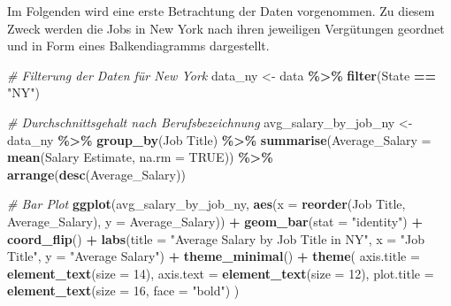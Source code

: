\documentclass[
]{article}
\newenvironment{Shaded}{\begin{snugshade}}{\end{snugshade}}
\newcommand{\AttributeTok}[1]{\textcolor[rgb]{0.13,0.29,0.53}{#1}}
\newcommand{\CommentTok}[1]{\textcolor[rgb]{0.56,0.35,0.01}{\textit{#1}}}
\newcommand{\ConstantTok}[1]{\textcolor[rgb]{0.56,0.35,0.01}{#1}}
\newcommand{\DecValTok}[1]{\textcolor[rgb]{0.00,0.00,0.81}{#1}}
\newcommand{\FunctionTok}[1]{\textcolor[rgb]{0.13,0.29,0.53}{\textbf{#1}}}
\newcommand{\NormalTok}[1]{#1}
\newcommand{\OtherTok}[1]{\textcolor[rgb]{0.56,0.35,0.01}{#1}}
\newcommand{\SpecialCharTok}[1]{\textcolor[rgb]{0.81,0.36,0.00}{\textbf{#1}}}
\newcommand{\StringTok}[1]{\textcolor[rgb]{0.31,0.60,0.02}{#1}}
\begin{document}
Im Folgenden wird eine erste Betrachtung der Daten vorgenommen. Zu
diesem Zweck werden die Jobs in New York nach ihren jeweiligen
Vergütungen geordnet und in Form eines Balkendiagramms dargestellt.

\begin{Shaded}
\begin{Highlighting}[]
\CommentTok{\# Filterung der Daten für New York}
\NormalTok{data\_ny }\OtherTok{\textless{}{-}}\NormalTok{ data }\SpecialCharTok{\%\textgreater{}\%}
  \FunctionTok{filter}\NormalTok{(State }\SpecialCharTok{==} \StringTok{"NY"}\NormalTok{)}

\CommentTok{\# Durchschnittsgehalt nach Berufsbezeichnung}
\NormalTok{avg\_salary\_by\_job\_ny }\OtherTok{\textless{}{-}}\NormalTok{ data\_ny }\SpecialCharTok{\%\textgreater{}\%}
  \FunctionTok{group\_by}\NormalTok{(}\StringTok{\textasciigrave{}}\AttributeTok{Job Title}\StringTok{\textasciigrave{}}\NormalTok{) }\SpecialCharTok{\%\textgreater{}\%}
  \FunctionTok{summarise}\NormalTok{(}\AttributeTok{Average\_Salary =} \FunctionTok{mean}\NormalTok{(}\StringTok{\textasciigrave{}}\AttributeTok{Salary Estimate}\StringTok{\textasciigrave{}}\NormalTok{, }\AttributeTok{na.rm =} \ConstantTok{TRUE}\NormalTok{)) }\SpecialCharTok{\%\textgreater{}\%}
  \FunctionTok{arrange}\NormalTok{(}\FunctionTok{desc}\NormalTok{(Average\_Salary))}

\CommentTok{\# Bar Plot}
\FunctionTok{ggplot}\NormalTok{(avg\_salary\_by\_job\_ny,}
       \FunctionTok{aes}\NormalTok{(}\AttributeTok{x =} \FunctionTok{reorder}\NormalTok{(}\StringTok{\textasciigrave{}}\AttributeTok{Job Title}\StringTok{\textasciigrave{}}\NormalTok{, Average\_Salary), }\AttributeTok{y =}\NormalTok{ Average\_Salary)) }\SpecialCharTok{+}
  \FunctionTok{geom\_bar}\NormalTok{(}\AttributeTok{stat =} \StringTok{"identity"}\NormalTok{) }\SpecialCharTok{+}
  \FunctionTok{coord\_flip}\NormalTok{() }\SpecialCharTok{+}
  \FunctionTok{labs}\NormalTok{(}\AttributeTok{title =} \StringTok{"Average Salary by Job Title in NY"}\NormalTok{,}
       \AttributeTok{x =} \StringTok{"Job Title"}\NormalTok{,}
       \AttributeTok{y =} \StringTok{"Average Salary"}\NormalTok{) }\SpecialCharTok{+}
  \FunctionTok{theme\_minimal}\NormalTok{() }\SpecialCharTok{+}
  \FunctionTok{theme}\NormalTok{(}
    \AttributeTok{axis.title =} \FunctionTok{element\_text}\NormalTok{(}\AttributeTok{size =} \DecValTok{14}\NormalTok{),}
    \AttributeTok{axis.text =} \FunctionTok{element\_text}\NormalTok{(}\AttributeTok{size =} \DecValTok{12}\NormalTok{),}
    \AttributeTok{plot.title =} \FunctionTok{element\_text}\NormalTok{(}\AttributeTok{size =} \DecValTok{16}\NormalTok{, }\AttributeTok{face =} \StringTok{"bold"}\NormalTok{)}
\NormalTok{  )}
\end{Highlighting}
\end{Shaded}
\end{document}
